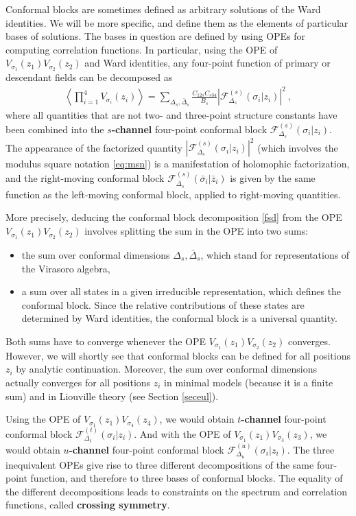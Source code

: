 \documentclass[12pt, a4paper, notitlepage, twoside]{report}
\numberwithin{equation}{section}
\theoremstyle{break}
\begin{document}
Conformal blocks are sometimes defined as arbitrary solutions of the Ward identities. We will be more specific, and define them as the elements of particular bases of solutions. The bases in question are defined by using OPEs for computing correlation functions. In particular, using the OPE of $V_{\sigma_1}(z_1)V_{\sigma_2}(z_2)$ and Ward identities, any four-point function of primary or descendant fields can be decomposed as 
\begin{align}
 \left\langle \prod_{i=1}^4 V_{\sigma_i}(z_i)\right\rangle 
 = \sum_{\Delta_s,\bar{\Delta}_s} \frac{C_{12s} C_{s34}}{B_s} \left| \mathcal{F}^{(s)}_{\Delta_s}(\sigma_i|z_i)\right|^2\ ,
\label{fsd}
\end{align}
where all quantities that are not two- and three-point structure constants have been combined into the \textbf{\boldmath $s$-channel} four-point conformal block $\mathcal{F}^{(s)}_{\Delta_s}(\sigma_i|z_i)$.
The appearance of the factorized quantity $\left| \mathcal{F}^{(s)}_{\Delta_s}(\sigma_i|z_i)\right|^2 $ (which involves the modulus square notation \eqref{eq:msn}) is a manifestation of holomophic factorization, and the right-moving conformal block $\mathcal{F}^{(s)}_{\bar\Delta_s}(\bar\sigma_i|\bar z_i)$ is given by the same function as the left-moving conformal block, applied to right-moving quantities. 

More precisely, deducing the conformal block decomposition \eqref{fsd} from the OPE $V_{\sigma_1}(z_1)V_{\sigma_2}(z_2)$ involves splitting the sum in the OPE into two sums:
\begin{itemize}
 \item the sum over conformal dimensions $\Delta_s,\bar{\Delta}_s$, which stand for representations of the Virasoro algebra,
 \item a sum over all states in a given irreducible representation, which defines the conformal block. Since the relative contributions of these states are determined by Ward identities, the conformal block is a universal quantity.
\end{itemize}
Both sums have to converge whenever the OPE $V_{\sigma_1}(z_1)V_{\sigma_2}(z_2)$ converges.
However, we will shortly see that conformal blocks can be defined for all positions $z_i$ by analytic continuation. Moreover, the sum over conformal dimensions actually converges for all positions $z_i$ in minimal models (because it is a finite sum) and in Liouville theory (see Section \ref{seceul}).

Using the OPE of $V_{\sigma_1}(z_1)V_{\sigma_4}(z_4)$, we would obtain \textbf{\boldmath $t$-channel} four-point conformal block $\mathcal{F}^{(t)}_{\Delta_t}(\sigma_i|z_i)$. And with the OPE of $V_{\sigma_1}(z_1)V_{\sigma_3}(z_3)$, we would obtain \textbf{\boldmath $u$-channel} four-point conformal block $\mathcal{F}^{(u)}_{\Delta_u}(\sigma_i|z_i)$. The three inequivalent OPEs give rise to three different decompositions of the same four-point function, and therefore to three bases of conformal blocks. The equality of the different decompositions leads to constraints on the spectrum and correlation functions, called \textbf{\boldmath crossing symmetry}.
\end{document}

